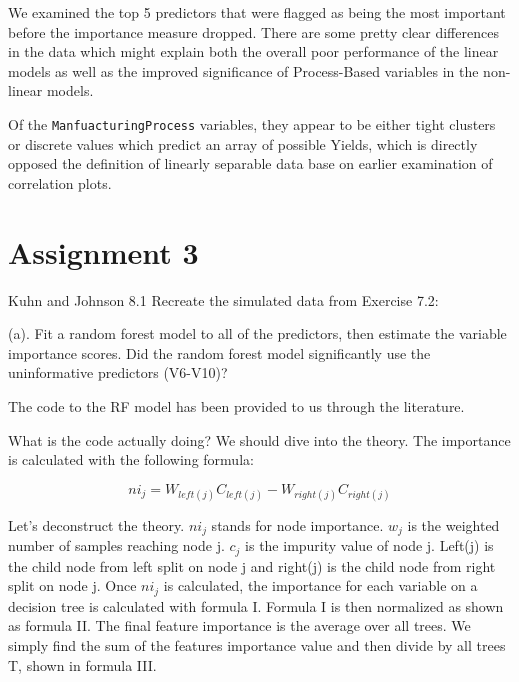 \documentclass[]{report}
\begin{document}
We examined the top 5 predictors that were flagged as being the most
important before the importance measure dropped. There are some pretty
clear differences in the data which might explain both the overall poor
performance of the linear models as well as the improved significance of
Process-Based variables in the non-linear models.

Of the \texttt{ManfuacturingProcess} variables, they appear to be either
tight clusters or discrete values which predict an array of possible
Yields, which is directly opposed the definition of linearly separable
data base on earlier examination of correlation plots.

\hypertarget{AS-3}{%
\chapter*{Assignment 3}\label{AS-3}}


\begin{question}{Kuhn and Johnson 8.1} Recreate the simulated data from Exercise 7.2: \end{question}

\begin{subquestion}{(a).} Fit a random forest model to all of the predictors, then estimate the variable importance scores. Did the random forest model significantly use the uninformative predictors (V6-V10)?\end{subquestion}

The code to the RF model has been provided to us through the literature.

What is the code actually doing? We should dive into the theory. The
importance is calculated with the following formula:

\[
ni_j=W_{left(j)}C_{left(j)}-W_{right(j)}C_{right(j)}
\]

Let's deconstruct the theory. \(ni_j\) stands for node importance.
\(w_j\) is the weighted number of samples reaching node j. \(c_j\) is
the impurity value of node j. Left(j) is the child node from left split
on node j and right(j) is the child node from right split on node j.
Once \(ni_j\) is calculated, the importance for each variable on a
decision tree is calculated with formula I. Formula I is then normalized
as shown as formula II. The final feature importance is the average over
all trees. We simply find the sum of the features importance value and
then divide by all trees T, shown in formula III.
\end{document}
